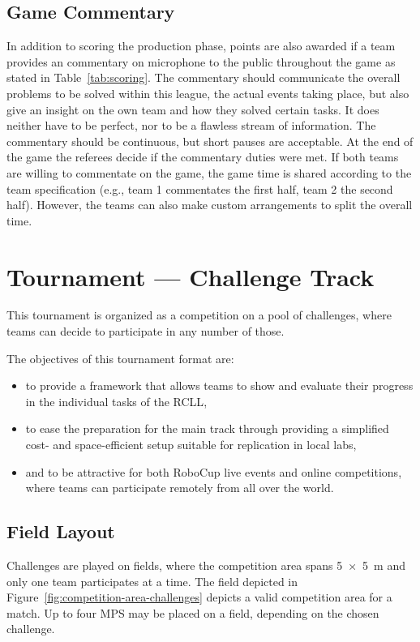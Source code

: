 \documentclass[12pt,twoside]{article}
\newcommand{\reffig}[1]{Figure~\ref{#1}}
\newcommand{\reftab}[1]{Table~\ref{#1}}
\begin{document}
\subsection{Game Commentary}
In addition to scoring the production phase,
points are also awarded if a team provides an commentary on microphone
to the public throughout the game as stated in \reftab{tab:scoring}.
The commentary should communicate the overall problems to be solved
within this league, the actual events taking place, but also give an
insight on the own team and how they solved certain tasks. It does
neither have to be perfect, nor to be a flawless stream of
information. The commentary should be continuous, but short pauses are
acceptable. At the end of the game the referees decide if the
commentary duties were met. If both teams are willing to commentate on
the game, the game time is shared according to the team specification
(e.g., team 1 commentates the first half, team 2 the second half).
However, the teams can also make custom arrangements to split the
overall time.



\section{Tournament --- Challenge Track}
\label{sec:tournament-challenges}
This tournament is organized as a competition on a pool of challenges, where
teams can decide to participate in any number of those.

The objectives of this tournament format are:
\begin{itemize}
 \item to provide a framework that allows teams to show and evaluate their
       progress in the individual tasks of the \ac{RCLL},
 \item to ease the preparation for the main track through providing a
       simplified cost- and space-efficient setup suitable for replication in
       local labs,
 \item and to be attractive for both RoboCup live events and online
       competitions, where teams can participate remotely from all over the
       world.
\end{itemize}

\subsection{Field Layout}
Challenges are played on fields, where the competition area spans
\SI{5 x 5}{\metre} and only one team participates at a time. %
The field depicted in \reffig{fig:competition-area-challenges} depicts a valid
competition area for a match.
Up to four \ac{MPS} may be placed on a field, depending on the chosen challenge.
\end{document}
